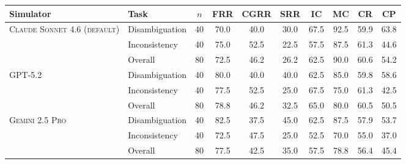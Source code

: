 \begin{tabular}{llcccccccc}
\toprule
\textbf{Simulator} & \textbf{Task} & $n$ & FRR & CGRR & SRR & IC & MC & CR & CP \\
\midrule
\multirow{3}{*}{\textsc{Claude Sonnet 4.6 (default)}} & Disambiguation  & 40 & 70.0 & 40.0 & 30.0 & 67.5 & 92.5 & 59.9 & 63.8 \\
 & Inconsistency  & 40 & 75.0 & 52.5 & 22.5 & 57.5 & 87.5 & 61.3 & 44.6 \\
 & Overall & 80 & 72.5 & 46.2 & 26.2 & 62.5 & 90.0 & 60.6 & 54.2 \\
\midrule
\multirow{3}{*}{\textsc{GPT-5.2}} & Disambiguation  & 40 & 80.0 & 40.0 & 40.0 & 62.5 & 85.0 & 59.8 & 58.6 \\
 & Inconsistency  & 40 & 77.5 & 52.5 & 25.0 & 67.5 & 75.0 & 61.3 & 42.5 \\
 & Overall & 80 & 78.8 & 46.2 & 32.5 & 65.0 & 80.0 & 60.5 & 50.5 \\
\midrule
\multirow{3}{*}{\textsc{Gemini 2.5 Pro}} & Disambiguation  & 40 & 82.5 & 37.5 & 45.0 & 62.5 & 87.5 & 57.9 & 53.7 \\
 & Inconsistency  & 40 & 72.5 & 47.5 & 25.0 & 52.5 & 70.0 & 55.0 & 37.0 \\
 & Overall & 80 & 77.5 & 42.5 & 35.0 & 57.5 & 78.8 & 56.4 & 45.4 \\
\bottomrule
\end{tabular}